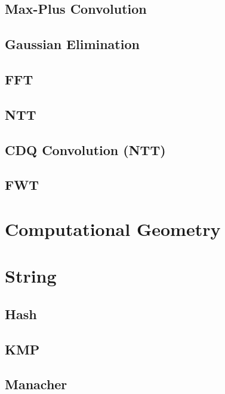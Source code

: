 \documentclass[10pt,a4paper]{article}
\newcommand{\codedir}{../code/}
\newcommand{\code}[2][]{%
}
\begin{document}
\begin{multicols}{2}
\subsection{Max-Plus Convolution}
\code{Max-Plus-Convolution(convex).cpp}

\subsection{Gaussian Elimination}
\code{Gaussian.cpp}

\subsection{FFT}
\code{FFT.cpp}

\subsection{NTT}
\code{NTT.cpp}

\subsection{CDQ Convolution (NTT)}
\code{CDQ_NTT.cpp}

\subsection{FWT}
\code{FWT.cpp}

\newpage

\section{Computational Geometry}
\code{Computational Geometry(2D).cpp}

\newpage

\section{String}

\subsection{Hash}
\code{Hash.cpp}

\subsection{KMP}
\code{KMP.cpp}

\subsection{Manacher}
\code{Manacher.cpp}


\end{multicols}
\end{document}
